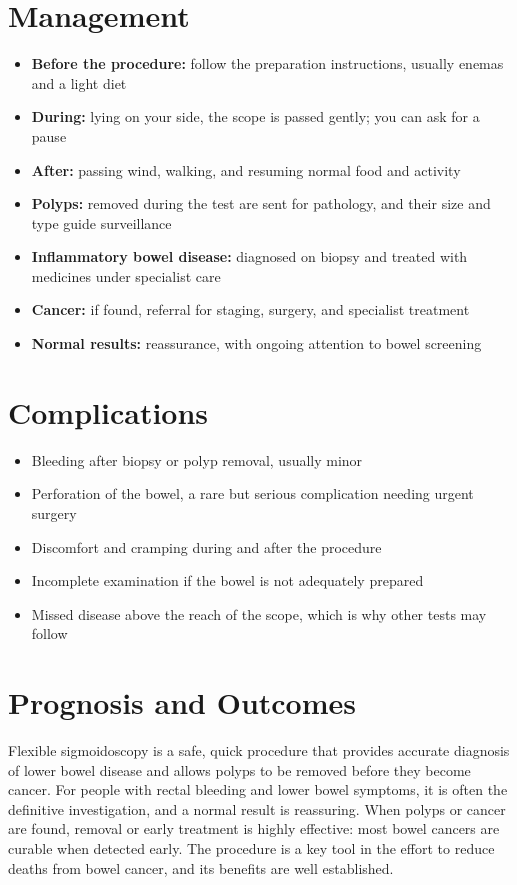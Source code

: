 \section*{Management}
\begin{itemize}
    \item \textbf{Before the procedure:} follow the preparation instructions, usually enemas and a light diet
    \item \textbf{During:} lying on your side, the scope is passed gently; you can ask for a pause
    \item \textbf{After:} passing wind, walking, and resuming normal food and activity
    \item \textbf{Polyps:} removed during the test are sent for pathology, and their size and type guide surveillance
    \item \textbf{Inflammatory bowel disease:} diagnosed on biopsy and treated with medicines under specialist care
    \item \textbf{Cancer:} if found, referral for staging, surgery, and specialist treatment
    \item \textbf{Normal results:} reassurance, with ongoing attention to bowel screening
\end{itemize}

\section*{Complications}
\begin{itemize}
    \item Bleeding after biopsy or polyp removal, usually minor
    \item Perforation of the bowel, a rare but serious complication needing urgent surgery
    \item Discomfort and cramping during and after the procedure
    \item Incomplete examination if the bowel is not adequately prepared
    \item Missed disease above the reach of the scope, which is why other tests may follow
\end{itemize}

\section*{Prognosis and Outcomes}
Flexible sigmoidoscopy is a safe, quick procedure that provides accurate diagnosis of lower bowel disease and allows polyps to be removed before they become cancer. For people with rectal bleeding and lower bowel symptoms, it is often the definitive investigation, and a normal result is reassuring. When polyps or cancer are found, removal or early treatment is highly effective: most bowel cancers are curable when detected early. The procedure is a key tool in the effort to reduce deaths from bowel cancer, and its benefits are well established.

